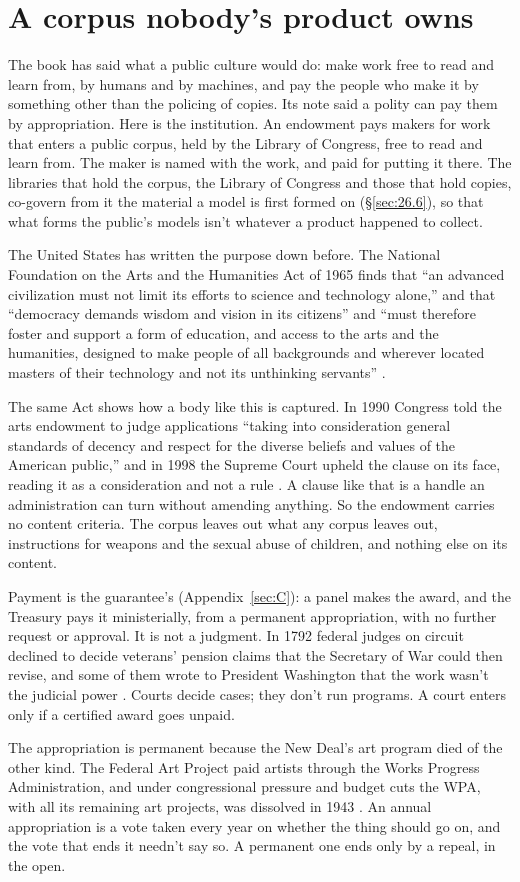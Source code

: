 \section{A corpus nobody's product owns}
\label{sec:28.5}
The book has said what a public culture would do: make work free to read and learn from, by humans and by machines, and pay the people who make it by something other than the policing of copies. Its note said a polity can pay them by appropriation. Here is the institution. An endowment pays makers for work that enters a public corpus, held by the Library of Congress, free to read and learn from. The maker is named with the work, and paid for putting it there. The libraries that hold the corpus, the Library of Congress and those that hold copies, co-govern from it the material a model is first formed on (\S\ref{sec:26.6}), so that what forms the public's models isn't whatever a product happened to collect.

The United States has written the purpose down before. The National Foundation on the Arts and the Humanities Act of 1965 finds that “an advanced civilization must not limit its efforts to science and technology alone,” and that “democracy demands wisdom and vision in its citizens” and “must therefore foster and support a form of education, and access to the arts and the humanities, designed to make people of all backgrounds and wherever located masters of their technology and not its unthinking servants” \autocite{us1965artsact}.

The same Act shows how a body like this is captured. In 1990 Congress told the arts endowment to judge applications “taking into consideration general standards of decency and respect for the diverse beliefs and values of the American public,” and in 1998 the Supreme Court upheld the clause on its face, reading it as a consideration and not a rule \autocite{us1965artsact,scotus1998finley}. A clause like that is a handle an administration can turn without amending anything. So the endowment carries no content criteria. The corpus leaves out what any corpus leaves out, instructions for weapons and the sexual abuse of children, and nothing else on its content.

Payment is the guarantee's (Appendix~\ref{sec:C}): a panel makes the award, and the Treasury pays it ministerially, from a permanent appropriation, with no further request or approval. It is not a judgment. In 1792 federal judges on circuit declined to decide veterans' pension claims that the Secretary of War could then revise, and some of them wrote to President Washington that the work wasn't the judicial power \autocite{fjc1792hayburn}. Courts decide cases; they don't run programs. A court enters only if a certified award goes unpaid.

The appropriation is permanent because the New Deal's art program died of the other kind. The Federal Art Project paid artists through the Works Progress Administration, and under congressional pressure and budget cuts the WPA, with all its remaining art projects, was dissolved in 1943 \autocite{house2025fap}. An annual appropriation is a vote taken every year on whether the thing should go on, and the vote that ends it needn't say so. A permanent one ends only by a repeal, in the open.
